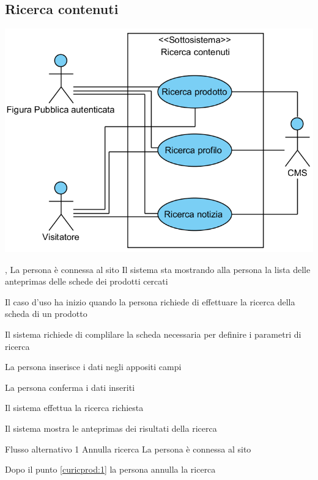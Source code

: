 \subsection{Ricerca contenuti}
\begin{center}
   \includegraphics[width=\textwidth]{assets/visualParadigm/cu/RicercaContenuti}
\end{center}
{, }
{La persona è connessa al sito}
{Il sistema sta mostrando alla persona la lista delle \glspl{anteprima} delle schede dei prodotti cercati}
{\begin{enumCU}
	\item Il caso d'uso ha inizio quando la persona richiede di effettuare la ricerca della scheda di un prodotto
	\item Il sistema richiede di complilare la scheda necessaria per definire i parametri di ricerca
	\item La persona inserisce i dati negli appositi campi \label{curicprod:1}
	\item La persona conferma i dati inseriti
	\item Il sistema effettua la ricerca richiesta
	\item Il sistema mostra le \glspl{anteprima} dei risultati della ricerca
\end{enumCU}
}
%
{Flusso alternativo 1}%
{Annulla ricerca}%
{La persona è connessa al sito}%
{\postNulle}%
{\begin{enumCU}
		\item Dopo il punto \ref{curicprod:1} la persona annulla la ricerca
	\end{enumCU}}%

